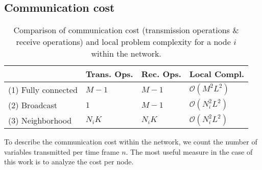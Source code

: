 \documentclass{article}
\begin{document}
\subsection[]{Communication cost}
\label{sec:transcost}
\renewcommand{\arraystretch}{1.2}
\begin{table}[t]
    \centering
    \begin{tabular}{ |l|l|l|l| }
        \hline
        & Trans. Ops. & Rec. Ops. & Local Compl. \\
        \hline\hline
        (1) Fully connected & \(M-1\) & \(M-1\) & \(\mathcal{O}(M^2 L^2)\) \\
        \hline
        (2) Broadcast & \(1\) & \(M-1\) & \(\mathcal{O}(N_i^2 L^2)\)  \\ 
        \hline
        (3) Neighborhood & \(N_i K\) & \(N_i K\) & \(\mathcal{O}(N_i^2 L^2)\)\\ 
        \hline
    \end{tabular}
    \caption[]{Comparison of communication cost (transmission operations \& receive operations) and local problem complexity for a node \(i\) within the network.}
    \label{tab:transcost:table}
\end{table}
\renewcommand{\arraystretch}{1.0}
To describe the communication cost within the network, we count the number of variables transmitted per time frame \(n\).
The most useful measure in the case of this work is to analyze the cost per node.
\end{document}
